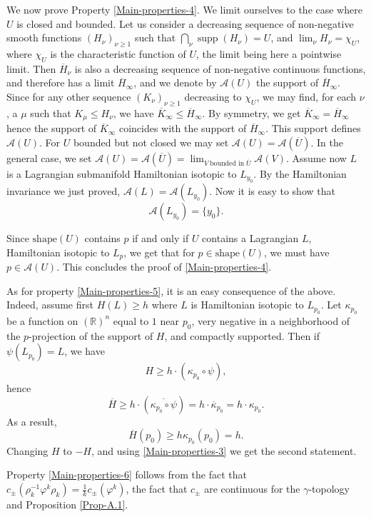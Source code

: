 \documentclass[JEP,XML,SOM,NoFloatCountersInSection,Unicode,published]{cedram}
\numberwithin{equation}{section}
\DeclareMathOperator{\supp}{supp}
\theoremstyle{plain}
\theoremstyle{definition}
\theoremstyle{remark}
\begin{document}
We now prove Property \eqref{Main-properties-4}. We limit ourselves to the case where $U$ is closed and bounded. Let us consider a decreasing sequence of non-negative smooth functions $(H_{\nu})_{\nu \geq 1}$ such that $\bigcap_\nu \supp (H_\nu)= U$, and $\lim_{\nu}H_{\nu}=\chi_{U}$, where $\chi_{U}$ is the characteristic function of $U$, the limit being here a pointwise limit. Then $\overline H_{\nu}$ is also a decreasing sequence of non-negative continuous functions, and therefore has a limit $\overline H_{\infty}$, and we denote by ${\mathcal A} (U)$ the support of $\overline H_{\infty}$. Since for any
other sequence $(K_{\nu})_{\nu \geq 1}$ decreasing to $\chi_{U}$, we may find, for each $\nu$, a $\mu$ such that $K_{\mu }\leq H_{\nu}$, we have $\overline K_{\infty} \leq \overline H_{\infty}$. By symmetry, we get $\overline K_{\infty} = \overline H_{\infty}$ hence the support of ${\overline K}_{\infty}$ coincides with the support of $\overline H_{\infty}$. This support defines ${\mathcal A}(U)$.
For $U$ bounded but not closed we may set ${\mathcal A} (U)={\mathcal A} (\overline U)$. In the general case, we set ${\mathcal A} (U)={\mathcal A} (\overline U)= \lim_{V \;\text{bounded in}\; \overline U} \mathcal A (V)$.
Assume now $L$ is a Lagrangian submanifold Hamiltonian isotopic to $L_{y_{0}}$. By the Hamiltonian invariance we just proved, ${\mathcal A}(L)={\mathcal A}(L_{y_{0}})$. Now it is easy to show that
\[
{\mathcal A}(L_{y_{0}})=\{y_{0}\}.
\]

Since $\mathrm{shape} (U)$ contains $p$ if and only if $U$ contains a Lagrangian $L$, Hamiltonian isotopic to $L_{p}$, we get that for $p \in \mathrm{shape} (U)$, we must have $ p\in \mathcal A (U)$. This concludes the proof of \eqref{Main-properties-4}.

As for property \eqref{Main-properties-5}, it is an easy consequence of the above. Indeed, assume first
$H(L)\geq h$ where $L$ is Hamiltonian isotopic to $L_{p_{0}}$. Let $\kappa_{p_{0}}$ be a function on $ ({\mathbb R})^n$ equal to $1$ near $p_{0}$, very negative in a neighborhood of the $p$-projection of the support of $H$, and compactly supported. Then if $\psi(L_{p_{0}})=L$, we have
\[
H\geq h\cdot (\kappa_{p_{0}}\circ \psi),
\]
hence
\[
\overline H \geq h\cdot (\overline {\kappa_{p_{0}} \circ \psi})=h\cdot \overline \kappa_{p_{0}}=h\cdot \kappa_{p_{0}}.
\]
As a result,
\[
\overline H(p_{0})\geq h \kappa_{p_{0}}(p_{0})=h.
\]
Changing $H$ to $-H$, and using \eqref{Main-properties-3} we get the second statement.

Property \eqref{Main-properties-6} follows from the fact that $c_\pm(\rho_k^{-1}\varphi^k\rho_k)=\frac{1}{k} c_\pm (\varphi^k)$, the fact that $c_\pm$ are continuous for the $\gamma$-topology and Proposition \ref{Prop-A.1}.
\end{document}
